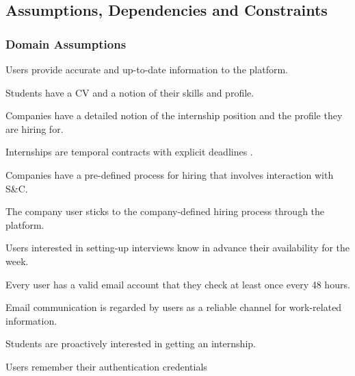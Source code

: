 \subsection{Assumptions, Dependencies and Constraints}
\subsubsection{Domain Assumptions}
    \begin{enumerate}[label={[DA\arabic*]}]
        \item Users provide accurate and up-to-date information to the platform.
        \item Students have a CV and a notion of their skills and profile.
        \item Companies have a detailed notion of the internship position and the profile they are hiring for.
        \item Internships are temporal contracts with explicit deadlines .
        \item Companies have a pre-defined process for hiring that involves interaction with S\&C.
        \item The company user sticks to the company-defined hiring process through the platform.
        \item Users interested in setting-up interviews know in advance their availability for the week.
        \item Every user has a valid email account that they check at least once every 48 hours.
        \item Email communication is regarded by users as a reliable channel for work-related information.
        \item Students are proactively interested in getting an internship.
        \item Users remember their authentication credentials
    \end{enumerate}
